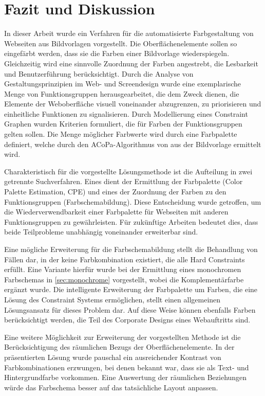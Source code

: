 \section{Fazit und Diskussion}

In dieser Arbeit wurde ein Verfahren für die automatisierte Farbgestaltung von Webseiten aus Bildvorlagen vorgestellt. Die Oberflächenelemente sollen so eingefärbt werden, dass sie die Farben einer Bildvorlage wiederspiegeln. Gleichzeitig wird eine sinnvolle Zuordnung der Farben angestrebt, die Lesbarkeit und Benutzerführung berücksichtigt. Durch die Analyse von Gestaltungsprinzipien im Web- und Screendesign wurde eine exemplarische Menge von Funktionsgruppen herausgearbeitet, die dem Zweck dienen, die Elemente der Weboberfläche visuell voneinander abzugrenzen, zu priorisieren und einheitliche Funktionen zu signalisieren. Durch Modellierung eines Constraint Graphen wurden Kriterien formuliert, die für Farben der Funktionsgruppen gelten sollen. Die Menge möglicher Farbwerte wird durch eine Farbpalette definiert, welche durch den ACoPa-Algorithmus von \citet{acopa} aus der Bildvorlage ermittelt wird.

Charakteristisch für die vorgestellte Lösungsmethode ist die Aufteilung in zwei getrennte Suchverfahren. Eines dient der Ermittlung der Farbpalette (Color Palette Estimation, CPE) und eines der Zuordnung der Farben zu den Funktionsgruppen (Farbschemabildung). Diese Entscheidung wurde getroffen, um die Wiederverwendbarkeit einer Farbpalette für Webseiten mit anderen Funktionsgruppen zu gewährleisten. Für zukünftige Arbeiten bedeutet dies, dass beide Teilprobleme unabhängig voneinander erweiterbar sind.

Eine mögliche Erweiterung für die Farbschemabildung stellt die Behandlung von Fällen dar, in der keine Farbkombination existiert, die alle Hard Constraints erfüllt. Eine Variante hierfür wurde bei der Ermittlung eines monochromen Farbschemas in  \autoref{sec:monochrome} vorgestellt, wobei die Komplementärfarbe ergänzt wurde. Die intelligente Erweiterung der Farbpalette um Farben, die eine Lösung des Constraint Systems ermöglichen, stellt einen allgemeinen Lösungsansatz für dieses Problem dar. Auf diese Weise können ebenfalls Farben berücksichtigt werden, die Teil des Corporate Designs eines Webauftritts sind.

Eine weitere Möglichkeit zur Erweiterung der vorgestellten Methode ist die Berücksichtigung des räumlichen Bezugs der Oberflächenelemente. In der präsentierten Lösung wurde pauschal ein ausreichender Kontrast von Farbkombinationen erzwungen, bei denen bekannt war, dass sie als Text- und Hintergrundfarbe vorkommen. Eine Auswertung der räumlichen Beziehungen würde das Farbschema besser auf das tatsächliche Layout anpassen.